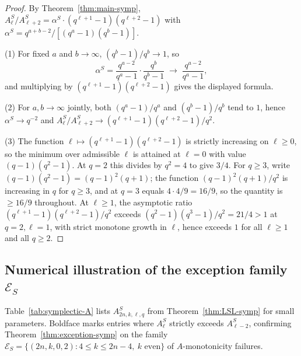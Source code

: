 \documentclass[10pt,a4paper]{amsart}
\begin{document}
\begin{proof}
By Theorem~\ref{thm:main-symp},
$A^S_\ell/A^S_{\ell+2} = \alpha^S \cdot (q^{\ell+1}-1)(q^{\ell+2}-1)$ with
$\alpha^S = q^{a+b-2}/[(q^a-1)(q^b-1)]$.

(1) For fixed $a$ and $b \to \infty$, $(q^b - 1)/q^b \to 1$, so
\[
  \alpha^S = \frac{q^{a-2}}{q^a - 1} \cdot \frac{q^b}{q^b - 1}
  \;\longrightarrow\; \frac{q^{a-2}}{q^a - 1},
\]
and multiplying by $(q^{\ell+1}-1)(q^{\ell+2}-1)$ gives the displayed formula.

(2) For $a, b \to \infty$ jointly, both $(q^a - 1)/q^a$ and $(q^b - 1)/q^b$
tend to $1$, hence $\alpha^S \to q^{-2}$ and $A^S_\ell/A^S_{\ell+2} \to
(q^{\ell+1}-1)(q^{\ell+2}-1)/q^2$.

(3) The function $\ell \mapsto (q^{\ell+1}-1)(q^{\ell+2}-1)$ is strictly
increasing on $\ell \geq 0$, so the minimum over admissible $\ell$ is attained
at $\ell = 0$ with value $(q-1)(q^2-1)$. At $q = 2$ this divides by $q^2 = 4$
to give $3/4$. For $q \geq 3$, write $(q-1)(q^2-1) = (q-1)^2(q+1)$; the
function $(q-1)^2(q+1)/q^2$ is increasing in $q$ for $q \geq 3$, and at
$q = 3$ equals $4 \cdot 4/9 = 16/9$, so the quantity is $\geq 16/9$
throughout. At $\ell \geq 1$, the asymptotic ratio
$(q^{\ell+1}-1)(q^{\ell+2}-1)/q^2$ exceeds $(q^2-1)(q^3-1)/q^2 = 21/4 > 1$
at $q = 2, \ell = 1$, with strict monotone growth in $\ell$, hence exceeds
$1$ for all $\ell \geq 1$ and all $q \geq 2$.
\end{proof}

\subsection{Numerical illustration of the exception family
  \texorpdfstring{$\mathcal{E}_S$}{E\_S}}\label{sec:Snum}

Table~\ref{tab:symplectic-A} lists $A^S_{2n,k,\ell,q}$ from
Theorem~\ref{thm:LSL-symp} for small parameters. Boldface marks entries where
$A^S_\ell$ strictly exceeds $A^S_{\ell-2}$, confirming
Theorem~\ref{thm:exception-symp} on the family
$\mathcal{E}_S = \{(2n, k, 0, 2) : 4 \leq k \leq 2n - 4,\ k \text{ even}\}$
of $A$-monotonicity failures.
\end{document}
